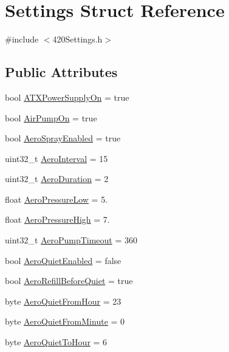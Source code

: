 \hypertarget{struct_settings}{}\section{Settings Struct Reference}
\label{struct_settings}


{\ttfamily \#include $<$420\+Settings.\+h$>$}

\subsection*{Public Attributes}
\begin{DoxyCompactItemize}
\item 
bool \mbox{\hyperlink{struct_settings_aa0f09634ac2ed8005a3cc0df485f9f0f}{A\+T\+X\+Power\+Supply\+On}} = true
\item 
bool \mbox{\hyperlink{struct_settings_a0b251103f111ebc2f63461b85f77ccd5}{Air\+Pump\+On}} = true
\item 
bool \mbox{\hyperlink{struct_settings_a95e8143a34a0ef0ae5ff6a11e8f32bc7}{Aero\+Spray\+Enabled}} = true
\item 
uint32\+\_\+t \mbox{\hyperlink{struct_settings_acb042ccc3be4d2d87833a3de179b416a}{Aero\+Interval}} = 15
\item 
uint32\+\_\+t \mbox{\hyperlink{struct_settings_aab26c785fe46831f3af6c2486e944de7}{Aero\+Duration}} = 2
\item 
float \mbox{\hyperlink{struct_settings_a1810a4bc777b1d2817330297a541a018}{Aero\+Pressure\+Low}} = 5.
\item 
float \mbox{\hyperlink{struct_settings_ac7f14ddf251d3305149e41f450a06bbf}{Aero\+Pressure\+High}} = 7.
\item 
uint32\+\_\+t \mbox{\hyperlink{struct_settings_a0c98b7826925ce351458cde56d5ea43f}{Aero\+Pump\+Timeout}} = 360
\item 
bool \mbox{\hyperlink{struct_settings_a616ff00e526ffdde8dfe160f040a4588}{Aero\+Quiet\+Enabled}} = false
\item 
bool \mbox{\hyperlink{struct_settings_a4e5a318be53e6c2ef9cb0a6d88bea1f9}{Aero\+Refill\+Before\+Quiet}} = true
\item 
byte \mbox{\hyperlink{struct_settings_a01f77faaf53b335dc6dd418afc128082}{Aero\+Quiet\+From\+Hour}} = 23
\item 
byte \mbox{\hyperlink{struct_settings_ae7b548ea9b04e4a04917f47e28a2e0d3}{Aero\+Quiet\+From\+Minute}} = 0
\item 
byte \mbox{\hyperlink{struct_settings_a502dde4abda23990af4a691588485a01}{Aero\+Quiet\+To\+Hour}} = 6

\end{DoxyCompactItemize}
